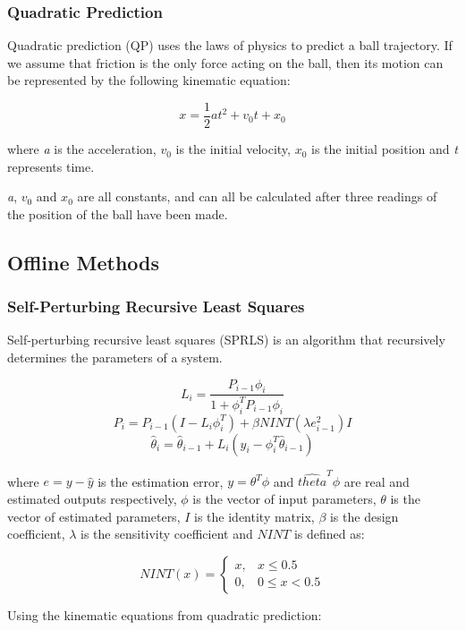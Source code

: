 \subsubsection{Quadratic Prediction}

Quadratic prediction (QP) uses the laws of physics to predict a ball trajectory. If we assume that friction is the only force acting on the ball, then its motion can be represented by the following kinematic equation:

\[ x = \frac{1}{2}at^2 + v_0t + x_0 \]

where \textit{a} is the acceleration, \textit{$v_0$} is the initial velocity, \textit{$x_0$} is the initial position and \textit{t} represents time.

\textit{a}, \textit{$v_0$} and \textit{$x_0$} are all constants, and can all be calculated after three readings of the position of the ball have been made.

\subsection{Offline Methods}

\subsubsection{Self-Perturbing Recursive Least Squares}

Self-perturbing recursive least squares\cite{Park1992} (SPRLS) is an algorithm that recursively determines the parameters of a system. 

\[ L_i = \frac{P_{i-1} \phi_i}{1 + \phi^T_i P_{i-1} \phi_i} \]
\[ P_i = P_{i-1}(I - L_i \phi^T_i) + \beta NINT(\lambda e^2_{i-1})I \]
\[ \hat{\theta}_i = \hat{\theta}_{i-1} + L_i(y_i - \phi^T_i \hat{\theta}_{i-1}) \]

\noindent where $e = y - \hat{y}$ is the estimation error, $y = \theta^T \phi$ and $\hat{theta}^T \phi$ are real and estimated outputs respectively, $\phi$ is the vector of input parameters, $\theta$ is the vector of estimated parameters, $I$ is the identity matrix, $\beta$ is the design coefficient, $\lambda$ is the sensitivity coefficient and $NINT$ is defined as:

\[ NINT(x) = \begin{cases}
    x, & x \leq 0.5 \\
    0, & 0 \leq x < 0.5
\end{cases}
\]

Using the kinematic equations from quadratic prediction:

